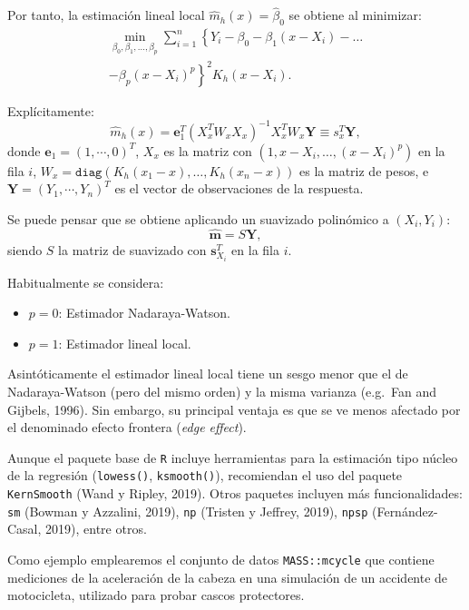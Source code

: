 \documentclass[]{book}
\theoremstyle{break}
\theoremstyle{definition}
\theoremstyle{definition}
\theoremstyle{definition}
\theoremstyle{remark}
\begin{document}
Por tanto, la estimación lineal local \(\hat{m}_{h}(x)=\hat{\beta}_0\)
se obtiene al minimizar: \[\begin{aligned}
    \min_{\beta_0 ,\beta_1, \ldots, \beta_p}
    \sum_{i=1}^{n}\left\{ Y_{i} - \beta_0 
    -\beta_1(x - X_i) - \ldots \right. \nonumber \\
    \left. -\beta_p(x - X_i)^p \right\}^{2}
    K_{h}(x - X_i).
\end{aligned}\]

Explícitamente: \[\hat{m}_{h}(x) = \mathbf{e}_{1}^{T} \left(
X_{x}^{T} {W}_{x} 
X_{x} \right)^{-1} X_{x}^{T} 
{W}_{x}\mathbf{Y} \equiv {s}_{x}^{T}\mathbf{Y},\] donde
\(\mathbf{e}_{1} = \left( 1, \cdots, 0\right)^{T}\), \(X_{x}\) es la
matriz con \((1,x - X_i, \ldots, (x - X_i)^p)\) en la fila \(i\),
\(W_{x} = \mathtt{diag} \left( K_{h}(x_{1} - x), \ldots, K_{h}(x_{n} - x) \right)\)
es la matriz de pesos, e
\(\mathbf{Y} = \left( Y_1, \cdots, Y_n\right)^{T}\) es el vector de
observaciones de la respuesta.

Se puede pensar que se obtiene aplicando un suavizado polinómico a
\((X_i, Y_i)\): \[\hat{\boldsymbol{m}} = S\mathbf{Y},\] siendo \(S\) la
matriz de suavizado con \(\mathbf{s}_{X_{i}}^{T}\) en la fila \(i\).

Habitualmente se considera:

\begin{itemize}
\item
  \(p=0\): Estimador Nadaraya-Watson.
\item
  \(p=1\): Estimador lineal local.
\end{itemize}

Asintóticamente el estimador lineal local tiene un sesgo menor que el de
Nadaraya-Watson (pero del mismo orden) y la misma varianza (e.g.~Fan and
Gijbels, 1996). Sin embargo, su principal ventaja es que se ve menos
afectado por el denominado efecto frontera (\emph{edge effect}).

Aunque el paquete base de \texttt{R} incluye herramientas para la
estimación tipo núcleo de la regresión (\texttt{lowess()},
\texttt{ksmooth()}), recomiendan el uso del paquete \texttt{KernSmooth}
(Wand y Ripley, 2019). Otros paquetes incluyen más funcionalidades:
\texttt{sm} (Bowman y Azzalini, 2019), \texttt{np} (Tristen y Jeffrey,
2019), \texttt{npsp} (Fernández-Casal, 2019), entre otros.

Como ejemplo emplearemos el conjunto de datos \texttt{MASS::mcycle} que
contiene mediciones de la aceleración de la cabeza en una simulación de
un accidente de motocicleta, utilizado para probar cascos protectores.
\end{document}
